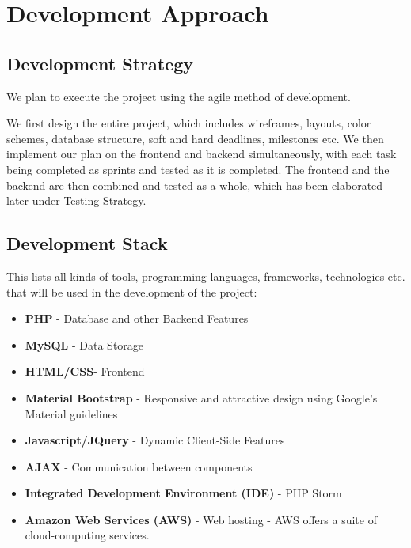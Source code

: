 \documentclass[12pt]{article}
\begin{document}
\section{Development Approach}

\subsection{Development Strategy}

We plan to execute the project using the agile method of development.

We first design the entire project, which includes wireframes, layouts, color schemes, database structure, soft and hard deadlines, milestones etc. We then implement our plan on the frontend and backend simultaneously, with each task being completed as sprints and tested as it is completed. The frontend and the backend are then combined and tested as a whole, which has been elaborated later under Testing Strategy.

\subsection{Development Stack}


This lists all kinds of tools, programming languages, frameworks, technologies etc. that will be used in the development of the project:


\begin{itemize}
    
    \item \textbf{PHP} - Database and other Backend Features

    \item \textbf{MySQL} - Data Storage
    
    \item \textbf{HTML/CSS}- Frontend
    
    \item \textbf{Material Bootstrap} - Responsive and attractive design using Google's Material guidelines
    
    \item \textbf{Javascript/JQuery} - Dynamic Client-Side Features
    
    \item \textbf{AJAX} - Communication between components
    
    \item \textbf{Integrated Development Environment (IDE)} - PHP Storm
    
    \item \textbf{Amazon Web Services (AWS)} - Web hosting - AWS offers a suite of cloud-computing services.

\end{itemize}
\end{document}
